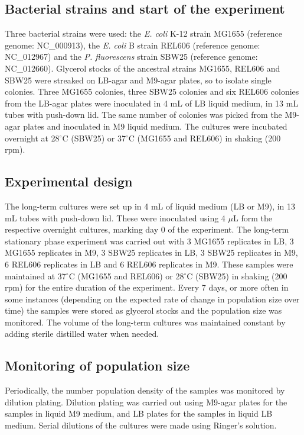 \documentclass[
	11pt,
	a4paper,
]{article} %
\begin{document}
\begin{multicols}{2}
\subsection*{Bacterial strains and start of the experiment}
Three bacterial strains were used: the \textit{E. coli} K-12 strain MG1655 (reference genome: NC\_000913), the \textit{E. coli} B strain REL606 (reference genome: NC\_012967) and the \textit{P. fluorescens} strain SBW25 (reference genome: NC\_012660).
Glycerol stocks of the ancestral strains MG1655, REL606 and SBW25 were streaked on LB-agar and M9-agar plates, so to isolate single colonies.
Three MG1655 colonies, three SBW25 colonies and six REL606 colonies from the LB-agar plates were inoculated in 4 mL of LB liquid medium, in 13 mL tubes with push-down lid.
The same number of colonies was picked from the M9-agar plates and inoculated in M9 liquid medium.
The cultures were incubated overnight at 28$^\circ$C (SBW25) or 37$^\circ$C (MG1655 and REL606) in shaking (200 rpm).

\subsection*{Experimental design}
The long-term cultures were set up in 4 mL of liquid medium (LB or M9), in 13 mL tubes with push-down lid.
These were inoculated using 4 $\mu$L form the respective overnight cultures, marking day 0 of the experiment.
The long-term stationary phase experiment was carried out with 3 MG1655 replicates in LB, 3 MG1655 replicates in M9, 3 SBW25 replicates in LB, 3 SBW25 replicates in M9, 6 REL606 replicates in LB and 6 REL606 replicates in M9.
These samples were maintained at 37$^\circ$C (MG1655 and REL606) or 28$^\circ$C (SBW25) in shaking (200 rpm) for the entire duration of the experiment.
Every 7 days, or more often in some instances (depending on the expected rate of change in population size over time) the samples were stored as glycerol stocks and the population size was monitored.
The volume of the long-term cultures was maintained constant by adding sterile distilled water when needed.

\subsection*{Monitoring of population size}
Periodically, the number population density of the samples was monitored by dilution plating.
Dilution plating was carried out using M9-agar plates for the samples in liquid M9 medium, and LB plates for the samples in liquid LB medium.
Serial dilutions of the cultures were made using Ringer's solution.


\end{multicols}
\end{document}
